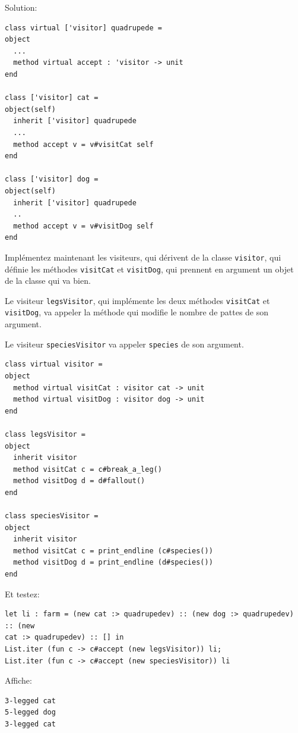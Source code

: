 \documentclass[a4paper]{article}
\begin{document}
Solution:

\begin{verbatim}
class virtual ['visitor] quadrupede =
object
  ...
  method virtual accept : 'visitor -> unit
end

class ['visitor] cat =
object(self)
  inherit ['visitor] quadrupede
  ...
  method accept v = v#visitCat self
end

class ['visitor] dog =
object(self)
  inherit ['visitor] quadrupede
  ..
  method accept v = v#visitDog self
end
\end{verbatim}

Implémentez maintenant les visiteurs, qui dérivent de la classe \verb|visitor|,
qui définie les méthodes \verb|visitCat| et \verb|visitDog|, qui prennent en
argument un objet de la classe qui va bien.

Le visiteur \verb|legsVisitor|, qui implémente les deux méthodes
\verb|visitCat| et \verb|visitDog|, va appeler la méthode qui modifie le nombre
de pattes de son argument.

Le visiteur \verb|speciesVisitor| va appeler \verb|species| de son argument.

\begin{verbatim}
class virtual visitor =
object
  method virtual visitCat : visitor cat -> unit
  method virtual visitDog : visitor dog -> unit
end

class legsVisitor =
object
  inherit visitor
  method visitCat c = c#break_a_leg()
  method visitDog d = d#fallout()
end

class speciesVisitor =
object
  inherit visitor
  method visitCat c = print_endline (c#species())
  method visitDog d = print_endline (d#species())
end
\end{verbatim}

Et testez:

\begin{verbatim}
let li : farm = (new cat :> quadrupedev) :: (new dog :> quadrupedev) :: (new
cat :> quadrupedev) :: [] in
List.iter (fun c -> c#accept (new legsVisitor)) li;
List.iter (fun c -> c#accept (new speciesVisitor)) li
\end{verbatim}

Affiche:
\begin{verbatim}
3-legged cat
5-legged dog
3-legged cat
\end{verbatim}
\end{document}

